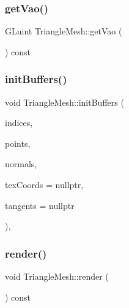 \mbox{\label{class_triangle_mesh_a6f1bd6279aa61bd2cf0b8a72c8d3035f}} 
\subsubsection{\texorpdfstring{getVao()}{getVao()}}
{\footnotesize\ttfamily G\+Luint Triangle\+Mesh\+::get\+Vao (\begin{DoxyParamCaption}{ }\end{DoxyParamCaption}) const\hspace{0.3cm}{\ttfamily [inline]}}

\mbox{\label{class_triangle_mesh_a4b115a2f023767efab11cfb44d8eb4c4}} 
\subsubsection{\texorpdfstring{initBuffers()}{initBuffers()}}
{\footnotesize\ttfamily void Triangle\+Mesh\+::init\+Buffers (\begin{DoxyParamCaption}\item[{std\+::vector$<$ G\+Luint $>$ $\ast$}]{indices,  }\item[{std\+::vector$<$ G\+Lfloat $>$ $\ast$}]{points,  }\item[{std\+::vector$<$ G\+Lfloat $>$ $\ast$}]{normals,  }\item[{std\+::vector$<$ G\+Lfloat $>$ $\ast$}]{tex\+Coords = {\ttfamily nullptr},  }\item[{std\+::vector$<$ G\+Lfloat $>$ $\ast$}]{tangents = {\ttfamily nullptr} }\end{DoxyParamCaption})\hspace{0.3cm}{\ttfamily [protected]}, {\ttfamily [virtual]}}

\mbox{\label{class_triangle_mesh_acd43f84016ec88e288df4c0f6739fc70}} 
\subsubsection{\texorpdfstring{render()}{render()}}
{\footnotesize\ttfamily void Triangle\+Mesh\+::render (\begin{DoxyParamCaption}{ }\end{DoxyParamCaption}) const\hspace{0.3cm}{\ttfamily [virtual]}}




